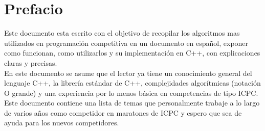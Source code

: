 \documentclass[12pt, a4paper]{article}
\begin{document}
	
	\section{Prefacio}
	
	
	Este documento esta escrito con el objetivo de recopilar los algoritmos mas utilizados en programación
	 competitiva en un documento en español, exponer como funcionan, como utilizarlos y su implementación en C++, 
	 con explicaciones claras y precisas.\\
	
	En este documento se asume que el lector ya tiene un conocimiento general del lenguaje C++, la librería estándar
	 de C++, complejidades algorítmicas (notación O grande) y una experiencia por lo menos básica en competencias de
	 tipo ICPC.\\
	
	Este documento contiene una lista de temas que personalmente trabaje a lo largo de
	 varios años como competidor en maratones de ICPC y espero que sea de ayuda para los nuevos competidores.\\
	
	
\end{document}
